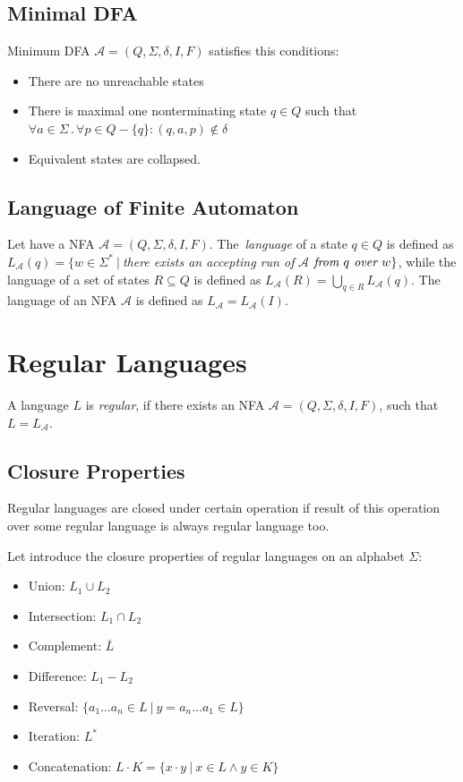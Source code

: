 	\subsection{Minimal DFA}
	\label{defMinDFA}
		Minimum DFA $\mathcal{A}=(Q,\Sigma,\delta,I,F)$ satisfies this conditions:
		\begin{itemize}
			\item There are no unreachable states
			\item There is maximal one nonterminating state $q\in Q$ such that 
        $\forall a\in \Sigma\,.\,\forall p\in Q-\{q\}: (q,a,p) \not \in \delta$
			\item Equivalent states are collapsed.
		\end{itemize}


  \subsection{Language of Finite Automaton}
  Let have a NFA $\mathcal{A}=(Q,\Sigma,\delta,I,F)$.
  The~\emph{language} of a state $q \in Q$ is defined as 
  $L_\mathcal{A}(q) = \{w\in \Sigma^{*}\ |\ $\emph{there exists an accepting run of }$
  \mathcal{A}$$ 
  \emph{ from }q\emph{ over }w\}$, while the language of a set of states $R\subseteq Q$ is defined as $L_{\mathcal{A}}(R)=\bigcup_{q\in R}L_{\mathcal{A}}(q)$.
  The language of an NFA $\mathcal{A}$ is defined as $L_{\mathcal{A}}=L_{\mathcal{A}}(I)$.

\section{Regular Languages}
		A language $L$ is \emph{regular}, if there exists an NFA $\mathcal{A}=(Q,\Sigma,\delta,I,F)$, such that $L=L_\mathcal{A}$.

    \subsection{Closure Properties}
    Regular languages are closed under certain operation if result of this operation over some regular language is always regular language too.

		Let introduce the closure properties of regular languages on an alphabet $\Sigma$:
		\begin{itemize}
			\item Union:  $L_1 \cup L_2$%
			\item Intersection:  $L_1 \cap L_2$%
			\item Complement: $\overline{L}$%
			\item Difference: $L_1-L_2$%
			\item Reversal: $\{a_1\dots a_n \in L \ |\ y=a_n\dots a_1 \in L\}$
			\item Iteration: $L^{*}$ %
			\item Concatenation: $L\cdot K=\{x \cdot y\ |\ x\in L \wedge y\in K\}$
		\end{itemize}

